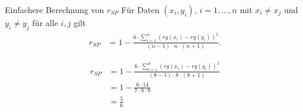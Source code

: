 \documentclass[t,11pt]{beamer}
\begin{document}
\begin{frame}
\begin{exampleblock}{Einfachere Berechnung von $r_{SP}$}
	Für Daten $(x_i,y_i)$, $i=1,\dots,n$ mit $x_i\neq x_j$ und $y_i\neq y_j$ für alle $i,j$ gilt
	\begin{align*}
	r_{SP}&=1-\frac{6 \cdot \sum_{i=1}^{n} (rg(x_i)-rg(y_i))^2}{(n-1)\cdot n \cdot (n+1)}.
	\end{align*}
\end{exampleblock}
\begin{align*}
r_{SP}&=1-\frac{6 \cdot \sum_{i=1}^{8} (rg(x_i)-rg(y_i))^2}{(8-1)\cdot 8 \cdot (8+1)}\\
&= 1-\frac{6 \cdot 14}{7\cdot 8 \cdot 9}\\
&= \frac{5}{6}
\end{align*}
\end{frame}
\end{document}

